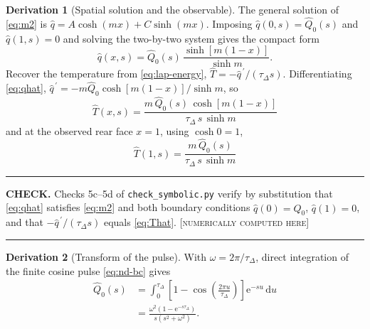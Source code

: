 \documentclass[11pt,a4paper]{article}
\theoremstyle{definition}
\newtheorem{derivationx}{Derivation}[section]
\newenvironment{checkbox}%
  {\par\medskip\noindent\begin{minipage}{\linewidth}%
   \rule{\linewidth}{0.4pt}\par\noindent\textbf{CHECK.}\enspace}%
  {\par\rule{\linewidth}{0.4pt}\end{minipage}\par\medskip}
\newcommand{\NUM}{\textcolor{red!55!black}{\footnotesize[\textsc{numerically computed here}]}}
\newcommand{\Lap}[1]{\hat{#1}}
\begin{document}
\begin{derivationx}[Spatial solution and the observable]
\label{der:That}
The general solution of \eqref{eq:m2} is
$\Lap q = A\cosh(mx)+C\sinh(mx)$. Imposing $\Lap q(0,s)=\Lap Q_{0}(s)$ and
$\Lap q(1,s)=0$ and solving the two-by-two system gives the compact form
\begin{equation}
  \Lap q(x,s)
   = \Lap Q_{0}(s)\,\frac{\sinh\!\left[m(1-x)\right]}{\sinh m} .
  \label{eq:qhat}
\end{equation}
Recover the temperature from \eqref{eq:lap-energy},
$\Lap T = -\Lap q^{\,\prime}/(\tau_{\Delta}s)$. Differentiating
\eqref{eq:qhat},
$\Lap q^{\,\prime} = -m\Lap Q_{0}\cosh\!\left[m(1-x)\right]/\sinh m$, so
\begin{equation}
  \boxed{\ \Lap T(x,s)
   = \frac{m\,\Lap Q_{0}(s)\,\cosh\!\left[m(1-x)\right]}
          {\tau_{\Delta}\,s\,\sinh m}\ }
  \label{eq:That}
\end{equation}
and at the observed rear face $x=1$, using $\cosh 0=1$,
\begin{equation}
  \boxed{\ \Lap T(1,s)
   = \frac{m\,\Lap Q_{0}(s)}{\tau_{\Delta}\,s\,\sinh m}\ }
  \label{eq:That-rear}
\end{equation}
\end{derivationx}

\begin{checkbox}
Checks 5c--5d of \texttt{check\_symbolic.py} verify by substitution that
\eqref{eq:qhat} satisfies \eqref{eq:m2} and both boundary conditions
$\Lap q(0)=\Lap Q_{0}$, $\Lap q(1)=0$, and that
$-\Lap q^{\,\prime}/(\tau_{\Delta}s)$ equals \eqref{eq:That}. \NUM
\end{checkbox}

\begin{derivationx}[Transform of the pulse]
\label{der:Q0}
With $\omega = 2\pi/\tau_{\Delta}$, direct integration of the finite cosine
pulse \eqref{eq:nd-bc} gives
\begin{align}
  \Lap Q_{0}(s)
   &= \int_{0}^{\tau_{\Delta}}
      \left[1-\cos\!\left(\frac{2\pi u}{\tau_{\Delta}}\right)\right]
      \mathrm{e}^{-su}\,\mathrm{d}u
  \nonumber\\
   &= \frac{\omega^{2}\left(1-\mathrm{e}^{-s\tau_{\Delta}}\right)}
           {s\left(s^{2}+\omega^{2}\right)} .
  \label{eq:Q0}
\end{align}
\end{derivationx}
\end{document}
